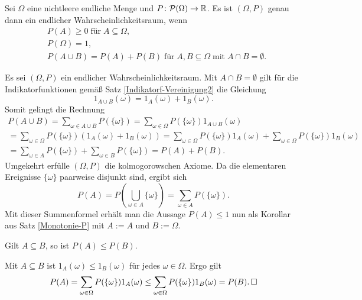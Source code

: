 \begin{Satz}\label{Axiome-Kolmogorow}%
\newlinefirst
Sei $\Omega$ eine nichtleere endliche Menge und
$P\colon\mathcal P(\Omega)\to\mathbb R$. Es ist $(\Omega,P)$ genau dann
ein endlicher Wahrscheinlichkeitsraum, wenn
\begin{align*}
& P(A) \ge 0\;\text{für}\;A\subseteq\Omega,\\
& P(\Omega) = 1,\\
& P(A\cup B) = P(A) + P(B)\;\text{für}\;A,B\subseteq\Omega\;
\text{mit}\;A\cap B=\emptyset.
\end{align*}
\end{Satz}
\begin{Beweis}
Es sei $(\Omega,P)$ ein endlicher Wahrscheinlichkeitsraum.
Mit $A\cap B=\emptyset$ gilt für die Indikatorfunktionen
gemäß Satz \ref{Indikatorf-Vereinigung2} die Gleichung
\[1_{A\cup B}(\omega) = 1_A(\omega) + 1_B(\omega).\]
Somit gelingt die Rechnung
\begin{gather*}
P(A\cup B) = \sum_{\omega\in A\cup B}P(\{\omega\})
= \sum_{\omega\in\Omega}P(\{\omega\})1_{A\cup B}(\omega)\\
= \sum_{\omega\in\Omega}P(\{\omega\})(1_A(\omega)+1_B(\omega))
= \sum_{\omega\in\Omega}P(\{\omega\})1_A(\omega)+
\sum_{\omega\in\Omega}P(\{\omega\})1_B(\omega)\\
= \sum_{\omega\in A}P(\{\omega\}) + \sum_{\omega\in B}P(\{\omega\})
= P(A) + P(B).
\end{gather*}
Umgekehrt erfülle $(\Omega,P)$ die kolmogorowschen Axiome. Da die
elementaren Ereignisse $\{\omega\}$ paarweise disjunkt sind, ergibt sich
\[P(A) = P(\bigcup_{\omega\in A}\{\omega\})
= \sum_{\omega\in A} P(\{\omega\}).\]
Mit dieser Summenformel erhält man die Aussage $P(A)\le 1$ nun als Korollar
aus Satz \ref{Monotonie-P} mit $A:=A$ und $B:=\Omega$.\,\qedsymbol
\end{Beweis}

\begin{Satz}\label{Monotonie-P}
Gilt $A\subseteq B$, so ist $P(A)\le P(B)$.
\end{Satz}
\begin{Beweis}
Mit $A\subseteq B$ ist $1_A(\omega)\le 1_B(\omega)$ für jedes $\omega\in\Omega$.
Ergo gilt
\[P(A) = \sum_{\omega\in\Omega} P(\{\omega\})1_A(\omega)
\le \sum_{\omega\in\Omega} P(\{\omega\})1_B(\omega) = P(B).\,\Box\]
\end{Beweis}


